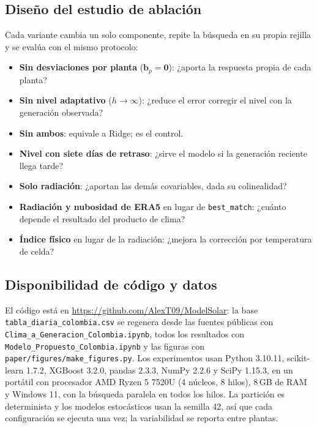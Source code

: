 \documentclass[pdflatex,sn-mathphys-num]{sn-jnl}
\begin{document}

\subsection{Diseño del estudio de ablación}\label{subsec:ablacion}

Cada variante cambia un solo componente, repite la búsqueda en su propia rejilla y se evalúa con el mismo protocolo:
\begin{itemize}
\item \textbf{Sin desviaciones por planta} ($\mathbf{b}_p=\mathbf{0}$): ¿aporta la respuesta propia de cada planta?
\item \textbf{Sin nivel adaptativo} ($h\to\infty$): ¿reduce el error corregir el nivel con la generación observada?
\item \textbf{Sin ambos}: equivale a Ridge; es el control.
\item \textbf{Nivel con siete días de retraso}: ¿sirve el modelo si la generación reciente llega tarde?
\item \textbf{Solo radiación}: ¿aportan las demás covariables, dada su colinealidad?
\item \textbf{Radiación y nubosidad de ERA5} en lugar de \texttt{best\_match}: ¿cuánto depende el resultado del producto de clima? \cite{urraca2018era5ghi}
\item \textbf{Índice físico} en lugar de la radiación: ¿mejora la corrección por temperatura de celda?
\end{itemize}


\subsection{Disponibilidad de código y datos}\label{subsec:disponibilidad}

El código está en \url{https://github.com/AlexT09/ModelSolar}: la base \texttt{tabla\_diaria\_colombia.csv} se regenera desde las fuentes públicas con \texttt{Clima\_a\_Generacion\_Colombia.ipynb}, todos los resultados con \texttt{Modelo\_Propuesto\_Colombia.ipynb} y las figuras con \texttt{paper/figures/make\_figures.py}. Los experimentos usan Python 3.10.11, scikit-learn 1.7.2, XGBoost 3.2.0, pandas 2.3.3, NumPy 2.2.6 y SciPy 1.15.3, en un portátil con procesador AMD Ryzen 5 7520U (4 núcleos, 8 hilos), 8\,GB de RAM y Windows 11, con la búsqueda paralela en todos los hilos. La partición es determinista y los modelos estocásticos usan la semilla 42, así que cada configuración se ejecuta una vez; la variabilidad se reporta entre plantas.
\end{document}
